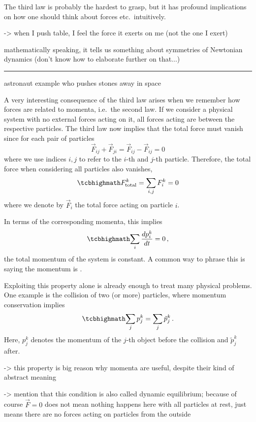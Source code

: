 \documentclass[../class_mech_main.tex]{subfiles}
\begin{document}
The third law is probably the hardest to grasp, but it has profound implications on how one should think about forces etc.~intuitively.

-> when I push table, I feel the force it exerts on me (not the one I exert)


mathematically speaking, it tells us something about symmetries of Newtonian dynamics (don't know how to elaborate further on that...)


\hrule

\begin{ex}
	astronaut example who pushes stones away in space
\end{ex}


\begin{ex}
	A very interesting consequence of the third law arises when we remember how forces are related to momenta, i.e.~the second law. If we consider a physical system with no external forces acting on it, all forces acting are between the respective particles. The third law now implies that the total force must vanish since for each pair of particles
	\begin{equation}
		\vec{F}_{ij} + \vec{F}_{ji} = \vec{F}_{ij} - \vec{F}_{ij} = 0
	\end{equation}
	where we use indices $i, j$ to refer to the $i$-th and $j$-th particle. Therefore, the total force when considering all particles also vanishes,
	\begin{equation}\label{eq:force_equilibrium}
		\eqbox{
			F_\mathrm{total}^k = \sum_{i, j} F_i^k = 0
		}
	\end{equation}
	where we denote by $\vec{F}_i$ the total force acting on particle $i$.

	In terms of the corresponding momenta, this implies
	\begin{equation}\label{eq:momentum_conservation}
		\eqbox{
			\sum_{i} \dv{p_i^k}{t} = 0
		} \, ,
	\end{equation}
	the total momentum of the system is constant. A common way to phrase this is saying the momentum is .

	Exploiting this property alone is already enough to treat many physical problems. One example is the collision of two (or more) particles, where momentum conservation implies
	\begin{equation}\label{eq:implication_momentum_conservation}
		\eqbox{
			\sum_j p_j^k = \sum_j \tilde{p}_j^k
		} \, .
	\end{equation}
	Here, $p_j^k$ denotes the momentum of the $j$-th object before the collision and $\tilde{p}_j^k$ after.

	-> this property is big reason why momenta are useful, despite their kind of abstract meaning

	-> mention that this condition is also called dynamic equilibrium; because of course $\vec{F} = 0$ does not mean nothing happens here with all particles at rest, just means there are no forces acting on particles from the outside
\end{ex}
\end{document}
